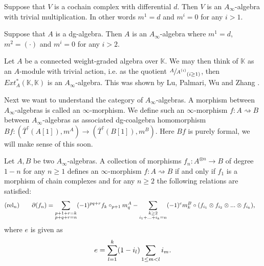 \documentclass[../thesis.tex]{subfiles}
\begin{document}
        \begin{example}
            Suppose that $V$ is a cochain complex with differential $d$. Then $V$ is an $A_\infty$-algebra with trivial multiplication. In other words $m^1 = d$ and $m^i = 0$ for any $i>1$.
        \end{example}

        \begin{example}
            Suppose that $A$ is a dg-algebra. Then $A$ is an $A_\infty$-algebra where $m^1 = d$, $m^2 = (\cdot)$ and $m^i=0$ for any $i>2$.
        \end{example}

        \begin{example}
            Let $A$ be a connected weight-graded algebra over $\mathbb{K}$. We may then think of $\mathbb{K}$ as an $A$-module with trivial action, i.e. as the quotient $\sfrac{A}{A^{(i)}}_{(i\geq 1)}$, then $Ext^*_A(\mathbb{K},\mathbb{K})$ is an $A_\infty$-algebra. This was shown by Lu, Palmari, Wu and Zhang \cite{Lu06}.
        \end{example}

        Next we want to understand the category of $A_\infty$-algebras. A morphism between $A_\infty$-algebras is called an $\infty$-morphism. We define such an $\infty$-morphism $f:A\rightsquigarrow B$ between $A_\infty$-algebras as associated dg-coalgebra homomorphism $Bf:(\overline{T}^c(A[1]), m^A)\rightarrow (\overline{T}^c(B[1]), m^B)$. Here $Bf$ is purely formal, we will make sense of this soon.

        \begin{proposition}
            Let $A,B$ be two $A_\infty$-algebras. A collection of morphisms $f_n : A^{\otimes n} \rightarrow B$ of degree $1-n$ for any $n \geq 1$ defines an $\infty$-morphism $f : A \rightsquigarrow B$ if and only if $f_1$ is a morphism of chain complexes and for any $n\geq 2$ the following relations are satisfied:
            \begin{align*}
                & (\text{rel}_n)\qquad \partial(f_n) = \sum_{\substack{p + 1 + r = k \\ p + q + r = n}}(-1)^{pq+r}f_k\circ_{p+1}m^A_q - \sum_{\substack{k\geq 2 \\ i_1 + ... + i_k = n}}(-1)^{e}m^B_k \circ (f_{i_1}\otimes f_{i_2}\otimes ... \otimes f_{i_k})\tt{,}
            \end{align*}
            where $e$ is given as
            \begin{align*}
                e = \sum_{l = 1}^k(1-i_l)\sum_{1\leq m < l}i_m\tt{.}
            \end{align*}
        \end{proposition}
        
\end{document}
